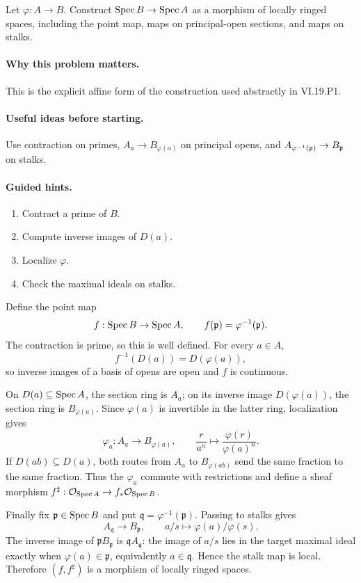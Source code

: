 \begin{problem}\label{prob:vi19-p02}
Let $\varphi:A\to B$. Construct $\operatorname{Spec} B\to\operatorname{Spec} A$ as a morphism of locally ringed spaces, including the point map, maps on principal-open sections, and maps on stalks.
\end{problem}

\ifdefined\FullProblemDossiers
\paragraph{Why this problem matters.}
This is the explicit affine form of the construction used abstractly in VI.19.P1.

\paragraph{Useful ideas before starting.}
Use contraction on primes, $A_a\to B_{\varphi(a)}$ on principal opens, and $A_{\varphi^{-1}(\mathfrak p)}\to B_{\mathfrak p}$ on stalks.

\paragraph{Guided hints.}
\begin{enumerate}
\item Contract a prime of $B$.
\item Compute inverse images of $D(a)$.
\item Localize $\varphi$.
\item Check the maximal ideals on stalks.
\end{enumerate}

\begin{solution}
Define the point map
\[
f:\operatorname{Spec} B\to\operatorname{Spec} A,
\qquad
f(\mathfrak p)=\varphi^{-1}(\mathfrak p).
\]
The contraction is prime, so this is well defined.  For every \(a\in A\),
\[
f^{-1}(D(a))=D(\varphi(a)),
\]
so inverse images of a basis of opens are open and \(f\) is continuous.

On \(D(a)\subseteq\operatorname{Spec} A\), the section ring is \(A_a\); on its inverse image \(D(\varphi(a))\), the section ring is \(B_{\varphi(a)}\).  Since \(\varphi(a)\) is invertible in the latter ring, localization gives
\[
\varphi_a:A_a\to B_{\varphi(a)},
\qquad
\frac r{a^n}\longmapsto\frac{\varphi(r)}{\varphi(a)^n}.
\]
If \(D(ab)\subseteq D(a)\), both routes from \(A_a\) to \(B_{\varphi(ab)}\) send the same fraction to the same fraction.  Thus the \(\varphi_a\) commute with restrictions and define a sheaf morphism \(f^\sharp:\mathcal O_{\operatorname{Spec} A}\to f_*\mathcal O_{\operatorname{Spec} B}\).

Finally fix \(\mathfrak p\in\operatorname{Spec} B\) and put \(\mathfrak q=\varphi^{-1}(\mathfrak p)\).  Passing to stalks gives
\[
A_{\mathfrak q}\to B_{\mathfrak p},
\qquad a/s\longmapsto\varphi(a)/\varphi(s).
\]
The inverse image of \(\mathfrak pB_{\mathfrak p}\) is \(\mathfrak qA_{\mathfrak q}\): the image of \(a/s\) lies in the target maximal ideal exactly when \(\varphi(a)\in\mathfrak p\), equivalently \(a\in\mathfrak q\).  Hence the stalk map is local.  Therefore \((f,f^\sharp)\) is a morphism of locally ringed spaces.
\end{solution}

